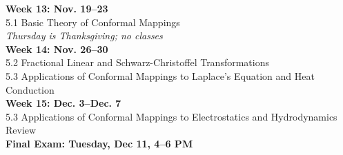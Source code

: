 \documentclass[11pt]{article}
\begin{document}
{\bf Week 13: Nov. 19--23}\\
5.1 Basic Theory of Conformal Mappings\\
{\it Thursday is Thanksgiving; no classes}\\

{\bf Week 14: Nov. 26--30}\\ 
5.2 Fractional Linear and Schwarz-Christoffel Transformations \\
5.3 Applications of Conformal Mappings to Laplace's Equation and  Heat  Conduction\\

{\bf Week 15: Dec. 3--Dec. 7}\\ 
5.3 Applications of Conformal Mappings to Electrostatics and Hydrodynamics\\
Review\\   

{\bf Final Exam: Tuesday, Dec 11, 4--6 PM}
\end{document}
